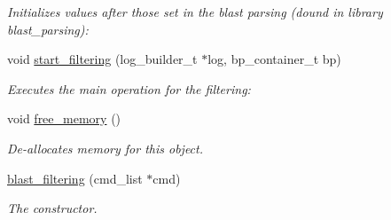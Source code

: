 \begin{DoxyCompactItemize}
\begin{DoxyCompactList}\small\item\em Initializes values after those set in the blast parsing (dound in library blast\_\-parsing): \end{DoxyCompactList}\item 
void \hyperlink{classblast__filtering_ae982e16ef24d27e3c00d29211bc375e9}{start\_\-filtering} (log\_\-builder\_\-t $\ast$log, bp\_\-container\_\-t bp)
\begin{DoxyCompactList}\small\item\em Executes the main operation for the filtering: \end{DoxyCompactList}\item 
\hypertarget{classblast__filtering_a651c3c51c2659bcc2dcd3dbb0831bced}{
void \hyperlink{classblast__filtering_a651c3c51c2659bcc2dcd3dbb0831bced}{free\_\-memory} ()}
\label{classblast__filtering_a651c3c51c2659bcc2dcd3dbb0831bced}

\begin{DoxyCompactList}\small\item\em De-\/allocates memory for this object. \end{DoxyCompactList}\item 
\hypertarget{classblast__filtering_aff42fb4acaf23b0ec50586db31c64fa0}{
\hyperlink{classblast__filtering_aff42fb4acaf23b0ec50586db31c64fa0}{blast\_\-filtering} (cmd\_\-list $\ast$cmd)}
\label{classblast__filtering_aff42fb4acaf23b0ec50586db31c64fa0}

\begin{DoxyCompactList}\small\item\em The constructor. \end{DoxyCompactList}\end{DoxyCompactItemize}

